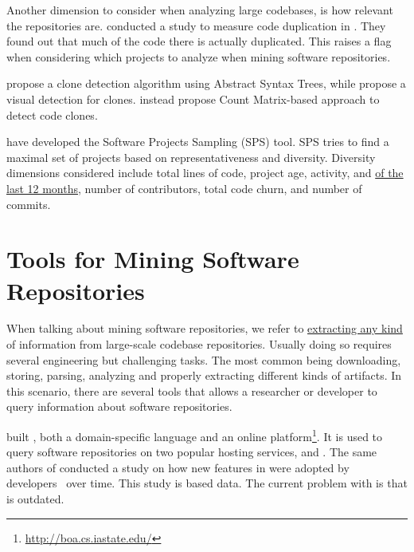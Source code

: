 Another dimension to consider when analyzing large codebases, is how relevant the repositories are.
\cite{lopesDeJaVuMapCode2017} conducted a study to measure code duplication in \github{}.
They found out that much of the code there is actually duplicated.
This raises a flag when considering which projects to analyze when mining software repositories.

\cite{baxterCloneDetectionUsing1998} propose a clone detection algorithm using Abstract Syntax Trees,
while \cite{riegerVisualDetectionDuplicated} propose a visual detection for clones.
\cite{yuanCMCDCountMatrix2011,chenReplicationReproductionCode} instead propose Count Matrix-based approach to detect code clones.

\cite{nagappanDiversitySoftwareEngineering2013} have developed the Software Projects Sampling (SPS) tool.
SPS tries to find a maximal set of projects based on representativeness and diversity.
Diversity dimensions considered include total lines of code,
project age, activity, and \underline{of the last 12 months}, number of contributors, total code churn, and number of commits.


\section{Tools for Mining Software Repositories}
\label{sec:lr:mining}

When talking about mining software repositories,
we refer to \underline{extracting any kind} of information from large-scale codebase repositories. 
Usually doing so requires several engineering but challenging tasks.
The most common being downloading, storing, parsing, analyzing and properly extracting different kinds of artifacts.
In this scenario, there are several tools that allows a researcher or developer to query information about software repositories.

\cite{dyerBoaLanguageInfrastructure2013,dyerDeclarativeVisitorsEase2013} built \boa{}, both a domain-specific language and an online platform\footnote{\url{http://boa.cs.iastate.edu/}}. 
It is used to query software repositories on two popular hosting services, \github{} and \sourceforge{}.
The same authors of \boa{} conducted a study on
how new features
in \java{} were adopted by developers~\cite{dyerMiningBillionsAST2014} over time.
This study is based \sourceforge{} data.
The current problem with \sourceforge{} is that is outdated.

